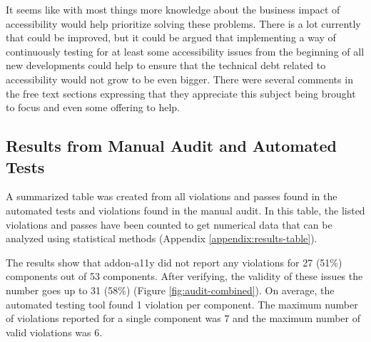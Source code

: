 \documentclass{master_thesis}
\begin{document}
It seems like with most things more knowledge about the business impact of accessibility would help prioritize solving these problems. There is a lot currently that could be improved, but it could be argued that implementing a way of continuously testing for at least some accessibility issues from the beginning of all new developments could help to ensure that the technical debt related to accessibility would not grow to be even bigger. There were several comments in the free text sections expressing that they appreciate this subject being brought to focus and even some offering to help.

\subsection{Results from Manual Audit and Automated Tests}


A summarized table was created from all violations and passes found in the automated tests and violations found in the manual audit. In this table, the listed violations and passes have been counted to get numerical data that can be analyzed using statistical methods (Appendix \ref{appendix:results-table}).

The results show that addon-a11y did not report any violations for 27 (51\%) components out of 53 components. After verifying, the validity of these issues the number goes up to 31 (58\%) (Figure \ref{fig:audit-combined}). On average, the automated testing tool found 1 violation per component. The maximum number of violations reported for a single component was 7 and the maximum number of valid violations was 6.
\end{document}
